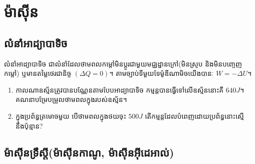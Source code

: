 \chapter{ម៉ាសុីន}
    \section{លំនាំអាដ្យាបាទិច}
    \begin{definition}
    	លំនាំអាដ្យាបាទិច ជាលំនាំដែលថាមពលកម្តៅមិនប្តូរជាមួយមជ្ឈដ្ឋានក្រៅ(មិនស្រូប និងមិនបញ្ចេញកម្តៅ) ឬមានតម្លៃថេរជានិច្ច $\left(\Delta Q=0\right)$។ តាមច្បាប់ទីមួយទែម៉ូឌីណាមិចយើងបានៈ $W=-\Delta U$។
    \end{definition}
    \begin{example}
    	\begin{enumerate}[m]
    		\item កាលណាឧស្ម័នត្រូវបានបណ្ណែនតាមបែបអាដ្យាបាទិច កម្មន្តបានធ្វើទៅលើឧស្ម័ននោះគឺ $640J$។\\ គណនាបម្រែបម្រួលថាមពលក្នុងរបស់ឧស្ម័ន។
    		\item ក្នុងប្រព័ន្ធត្រមោចមួយ បើថាមពលក្នុងថយចុះ $500J$ តើកម្មន្តដែលបំពេញដោយប្រព័ន្ធនោះស្មើនឹងប៉ុន្មាន?
    	\end{enumerate}
    \end{example}
    \section{ម៉ាសុីនទ្រឹស្តី(ម៉ាសុីនកាណូ, ម៉ាសុីនអុីដេអាល់)}
